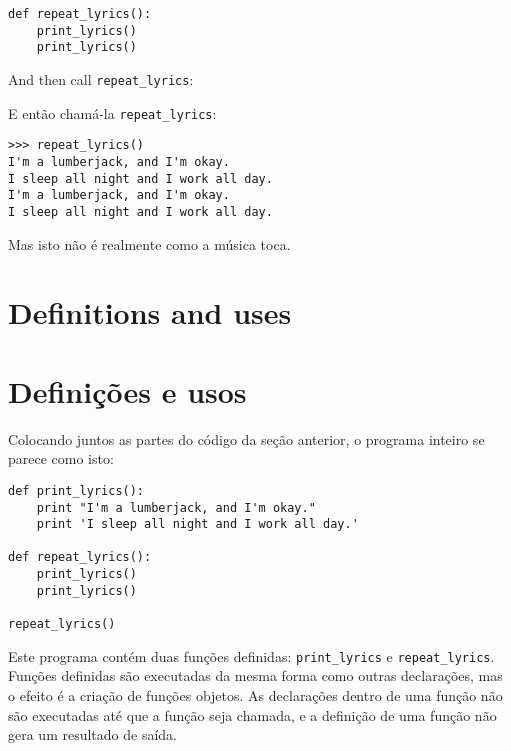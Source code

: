 \beforeverb
\begin{verbatim}
def repeat_lyrics():
    print_lyrics()
    print_lyrics()
\end{verbatim}
\afterverb
%
And then call \verb"repeat_lyrics":

%
E então chamá-la \verb"repeat_lyrics":

\beforeverb
\begin{verbatim}
>>> repeat_lyrics()
I'm a lumberjack, and I'm okay.
I sleep all night and I work all day.
I'm a lumberjack, and I'm okay.
I sleep all night and I work all day.
\end{verbatim}
\afterverb
%

%
Mas isto não é realmente como a música toca.

\section{Definitions and uses}
\section{Definições e usos}


Colocando juntos as partes do código da seção anterior, o programa inteiro
se parece como isto:

\beforeverb
\begin{verbatim}
def print_lyrics():
    print "I'm a lumberjack, and I'm okay."
    print 'I sleep all night and I work all day.'

def repeat_lyrics():
    print_lyrics()
    print_lyrics()

repeat_lyrics()
\end{verbatim}
\afterverb
%

%
Este programa contém duas funções definidas: \verb"print_lyrics" e
\verb"repeat_lyrics". Funções definidas são executadas da mesma forma como
outras declarações, mas o efeito é a criação de funções objetos. As
declarações dentro de uma função não são executadas até que a função
seja chamada, e a definição de uma função não gera um resultado de saída.


